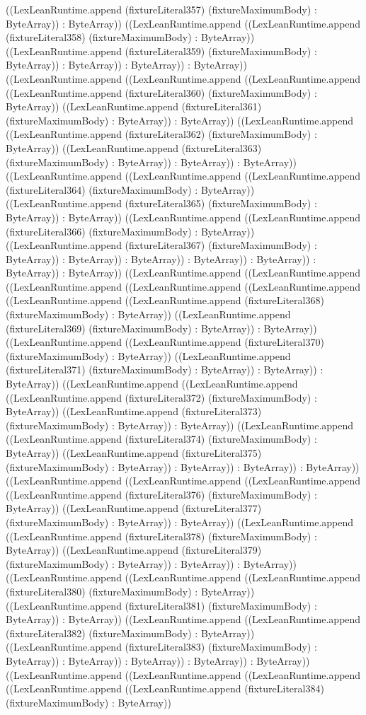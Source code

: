 \documentclass[11pt]{article}
\begin{document}
((LexLeanRuntime.append (fixtureLiteral357) (fixtureMaximumBody) : ByteArray)) : ByteArray)) ((LexLeanRuntime.append ((LexLeanRuntime.append (fixtureLiteral358) (fixtureMaximumBody) : ByteArray)) ((LexLeanRuntime.append (fixtureLiteral359) (fixtureMaximumBody) : ByteArray)) : ByteArray)) : ByteArray)) : ByteArray)) ((LexLeanRuntime.append ((LexLeanRuntime.append ((LexLeanRuntime.append ((LexLeanRuntime.append (fixtureLiteral360) (fixtureMaximumBody) : ByteArray)) ((LexLeanRuntime.append (fixtureLiteral361) (fixtureMaximumBody) : ByteArray)) : ByteArray)) ((LexLeanRuntime.append ((LexLeanRuntime.append (fixtureLiteral362) (fixtureMaximumBody) : ByteArray)) ((LexLeanRuntime.append (fixtureLiteral363) (fixtureMaximumBody) : ByteArray)) : ByteArray)) : ByteArray)) ((LexLeanRuntime.append ((LexLeanRuntime.append ((LexLeanRuntime.append (fixtureLiteral364) (fixtureMaximumBody) : ByteArray)) ((LexLeanRuntime.append (fixtureLiteral365) (fixtureMaximumBody) : ByteArray)) : ByteArray)) ((LexLeanRuntime.append ((LexLeanRuntime.append (fixtureLiteral366) (fixtureMaximumBody) : ByteArray)) ((LexLeanRuntime.append (fixtureLiteral367) (fixtureMaximumBody) : ByteArray)) : ByteArray)) : ByteArray)) : ByteArray)) : ByteArray)) : ByteArray)) : ByteArray)) ((LexLeanRuntime.append ((LexLeanRuntime.append ((LexLeanRuntime.append ((LexLeanRuntime.append ((LexLeanRuntime.append ((LexLeanRuntime.append ((LexLeanRuntime.append (fixtureLiteral368) (fixtureMaximumBody) : ByteArray)) ((LexLeanRuntime.append (fixtureLiteral369) (fixtureMaximumBody) : ByteArray)) : ByteArray)) ((LexLeanRuntime.append ((LexLeanRuntime.append (fixtureLiteral370) (fixtureMaximumBody) : ByteArray)) ((LexLeanRuntime.append (fixtureLiteral371) (fixtureMaximumBody) : ByteArray)) : ByteArray)) : ByteArray)) ((LexLeanRuntime.append ((LexLeanRuntime.append ((LexLeanRuntime.append (fixtureLiteral372) (fixtureMaximumBody) : ByteArray)) ((LexLeanRuntime.append (fixtureLiteral373) (fixtureMaximumBody) : ByteArray)) : ByteArray)) ((LexLeanRuntime.append ((LexLeanRuntime.append (fixtureLiteral374) (fixtureMaximumBody) : ByteArray)) ((LexLeanRuntime.append (fixtureLiteral375) (fixtureMaximumBody) : ByteArray)) : ByteArray)) : ByteArray)) : ByteArray)) ((LexLeanRuntime.append ((LexLeanRuntime.append ((LexLeanRuntime.append ((LexLeanRuntime.append (fixtureLiteral376) (fixtureMaximumBody) : ByteArray)) ((LexLeanRuntime.append (fixtureLiteral377) (fixtureMaximumBody) : ByteArray)) : ByteArray)) ((LexLeanRuntime.append ((LexLeanRuntime.append (fixtureLiteral378) (fixtureMaximumBody) : ByteArray)) ((LexLeanRuntime.append (fixtureLiteral379) (fixtureMaximumBody) : ByteArray)) : ByteArray)) : ByteArray)) ((LexLeanRuntime.append ((LexLeanRuntime.append ((LexLeanRuntime.append (fixtureLiteral380) (fixtureMaximumBody) : ByteArray)) ((LexLeanRuntime.append (fixtureLiteral381) (fixtureMaximumBody) : ByteArray)) : ByteArray)) ((LexLeanRuntime.append ((LexLeanRuntime.append (fixtureLiteral382) (fixtureMaximumBody) : ByteArray)) ((LexLeanRuntime.append (fixtureLiteral383) (fixtureMaximumBody) : ByteArray)) : ByteArray)) : ByteArray)) : ByteArray)) : ByteArray)) ((LexLeanRuntime.append ((LexLeanRuntime.append ((LexLeanRuntime.append ((LexLeanRuntime.append ((LexLeanRuntime.append (fixtureLiteral384) (fixtureMaximumBody) : ByteArray)) 
\end{document}
